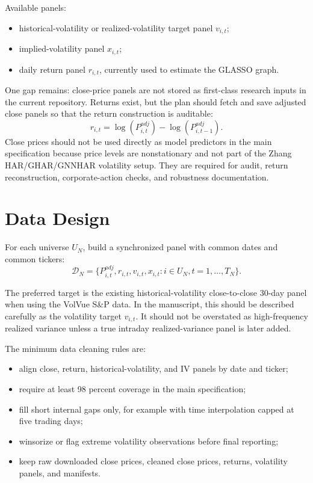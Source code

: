 \documentclass[11pt,a4paper]{article}
\begin{document}
Available panels:
\begin{itemize}[leftmargin=*]
  \item historical-volatility or realized-volatility target panel \(v_{i,t}\);
  \item implied-volatility panel \(x_{i,t}\);
  \item daily return panel \(r_{i,t}\), currently used to estimate the GLASSO graph.
\end{itemize}

One gap remains: close-price panels are not stored as first-class research inputs in the current repository. Returns exist, but the plan should fetch and save adjusted close panels so that the return construction is auditable:
\[
r_{i,t}=\log(P^{adj}_{i,t})-\log(P^{adj}_{i,t-1}).
\]
Close prices should not be used directly as model predictors in the main specification because price levels are nonstationary and not part of the Zhang HAR/GHAR/GNNHAR volatility setup. They are required for audit, return reconstruction, corporate-action checks, and robustness documentation.

\section{Data Design}

For each universe \(U_N\), build a synchronized panel with common dates and common tickers:
\[
\mathcal{D}_N=\{P^{adj}_{i,t}, r_{i,t}, v_{i,t}, x_{i,t}: i\in U_N, t=1,\ldots,T_N\}.
\]

The preferred target is the existing historical-volatility close-to-close 30-day panel when using the VolVue S\&P data. In the manuscript, this should be described carefully as the volatility target \(v_{i,t}\). It should not be overstated as high-frequency realized variance unless a true intraday realized-variance panel is later added.

The minimum data cleaning rules are:
\begin{itemize}[leftmargin=*]
  \item align close, return, historical-volatility, and IV panels by date and ticker;
  \item require at least 98 percent coverage in the main specification;
  \item fill short internal gaps only, for example with time interpolation capped at five trading days;
  \item winsorize or flag extreme volatility observations before final reporting;
  \item keep raw downloaded close prices, cleaned close prices, returns, volatility panels, and manifests.
\end{itemize}
\end{document}
